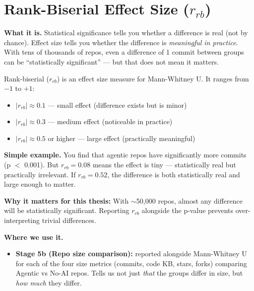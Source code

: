 \documentclass[11pt,a4paper]{article}
\begin{document}
\section{Rank-Biserial Effect Size ($r_{rb}$)}

\begin{conceptbox}
\textbf{What it is.}
Statistical significance tells you whether a difference is real (not by chance).
Effect size tells you whether the difference is \emph{meaningful in practice}.
With tens of thousands of repos, even a difference of 1 commit between groups can be
``statistically significant'' --- but that does not mean it matters.

\medskip
Rank-biserial ($r_{rb}$) is an effect size measure for Mann-Whitney U. It ranges from
$-1$ to $+1$:
\begin{itemize}
  \item $|r_{rb}| \approx 0.1$ --- small effect (difference exists but is minor)
  \item $|r_{rb}| \approx 0.3$ --- medium effect (noticeable in practice)
  \item $|r_{rb}| \approx 0.5$ or higher --- large effect (practically meaningful)
\end{itemize}

\medskip
\textbf{Simple example.}
You find that agentic repos have significantly more commits (p $<$ 0.001). But $r_{rb} = 0.08$
means the effect is tiny --- statistically real but practically irrelevant. If $r_{rb} = 0.52$,
the difference is both statistically real and large enough to matter.

\medskip
\textbf{Why it matters for this thesis:}
With $\sim$50{,}000 repos, almost any difference will be statistically significant.
Reporting $r_{rb}$ alongside the p-value prevents over-interpreting trivial differences.
\end{conceptbox}

\begin{wherebox}
\textbf{Where we use it.}
\begin{itemize}
  \item \textbf{Stage 5b (Repo size comparison):} reported alongside Mann-Whitney U for each
        of the four size metrics (commits, code KB, stars, forks) comparing Agentic vs No-AI repos.
        Tells us not just \emph{that} the groups differ in size, but \emph{how much} they differ.
\end{itemize}
\end{wherebox}
\end{document}
